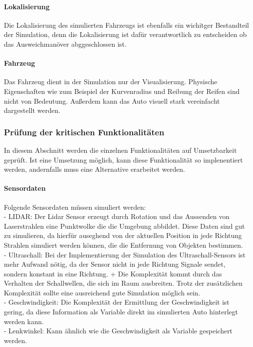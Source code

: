 \paragraph{Lokalisierung}
Die Lokalisierung des simulierten Fahrzeugs ist ebenfalls ein wichitger Bestandteil der Simulation, denn die Lokalisierung ist dafür verantwortlich zu entscheiden ob das Ausweichmanöver abggeschlossen ist.

\paragraph{Fahrzeug}
Das Fahrzeug dient in der Simulation nur der Visualisierung. Physische Eigenschaften wie zum Beispiel der Kurvenradius und Reibung der Reifen sind nicht von Bedeutung. Außerdem kann das Auto visuell stark vereinfacht dargestellt werden. 


\subsubsection{Prüfung der kritischen Funktionalitäten}
\label{pr}

In diesem Abschnitt werden die einzelnen Funktionalitäten auf Umsetzbarkeit geprüft. Ist eine Umsetzung möglich, kann diese Funktionalität so implenentiert werden, andernfalls muss eine Alternative erarbeitet werden.

\paragraph{Sensordaten}
Folgende Sensordaten müssen simuliert werden: \\
- LIDAR: Der Lidar Sensor erzeugt durch Rotation und das Aussenden von Laserstrahlen eine Punktwolke die die Umgebung abbildet.
 Diese Daten sind gut zu simulieren, da hierfür auseghend von der aktuellen Position in jede Richtung Strahlen simuliert werden können, die die Entfernung von Objekten bestimmen. \\
- Ultraschall: Bei der Implementierung der Simulation des Ultraschall-Sensors ist mehr Aufwand nötig, da der Sensor nicht in jede Richtung Signale sendet, sondern konstant in eine Richtung. +
Die Komplexität kommt durch das Verhalten der Schallwellen, die sich im Raum ausbreiten. Trotz der zusätzlichen Komplexität sollte eine ausreichend gute Simulation möglich sein.\\
- Geschwindigkeit: Die Komplexität der Ermittlung der Geschwindigkeit ist gering, da diese Information als Variable direkt im simulierten Auto hinterlegt werden kann.\\
- Lenkwinkel: Kann ähnlich wie die Geschwindigkeit als Variable gespeichert werden. 

